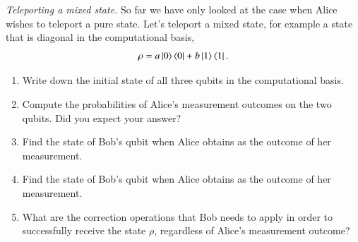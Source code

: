 \begin{exercise}
\emph{Teleporting a mixed state.} So far we have only looked at the case when Alice wishes to teleport a pure state. Let's teleport a mixed state, for example a state that is diagonal in the computational basis,
\begin{equation}
    \rho = a \left| 0 \right\rangle\left\langle 0 \right| + b \left| 1 \right\rangle\left\langle 1 \right|.
\end{equation}
\begin{enumerate}[label=(\alph*)]
    \item Write down the initial state of all three qubits in the computational basis.
    \item Compute the probabilities of Alice's measurement outcomes on the two qubits. Did you expect your answer?
    \item Find the state of Bob's qubit when Alice obtains \ket{\Phi^+} as the outcome of her measurement.
    \item Find the state of Bob's qubit when Alice obtains \ket{\Phi^-} as the outcome of her measurement.
    \item What are the correction operations that Bob needs to apply in order to successfully receive the state $\rho$, regardless of Alice's measurement outcome?
\end{enumerate}
\end{exercise}

